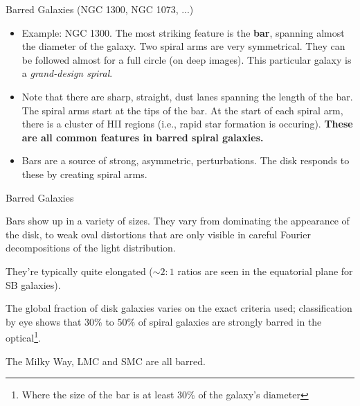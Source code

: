 \documentclass[letterpaper,landscape]{slides}
\begin{document}
\begin{slide}
\begin{center}
{\large \color{red} 
                  Barred Galaxies (NGC 1300, NGC 1073, ...)  }
\end{center}

\begin{itemize}
\item Example: NGC 1300. The most striking feature is the {\bf bar},
spanning almost the diameter of the galaxy. Two spiral arms are very
symmetrical. They can be followed almost for a full circle (on deep images).
This particular galaxy is a {\em grand-design spiral}.

\item Note that there are sharp, straight, dust lanes spanning the length of
the bar. The spiral arms start at the tips of the bar. At the start of each
spiral arm, there is a cluster of HII regions (i.e., rapid star formation is
occuring). {\bf These are all common features in barred spiral galaxies.}

\item Bars are a source of strong, asymmetric, perturbations. The disk responds
to these by creating spiral arms.

\end{itemize}

\vfill
\end{slide}


\begin{slide}
\begin{center}
{\large \color{red} 
                  Barred Galaxies  }
\end{center}

Bars show up in a variety of sizes. They vary from dominating the appearance
of the disk, to weak oval distortions that are only visible in careful
Fourier decompositions of the light distribution.

They're typically quite elongated ($\sim 2:1$ ratios are seen in the
equatorial plane for SB galaxies).

The global fraction of disk galaxies varies on the exact criteria used;
classification by eye shows that 30\% to 50\% of spiral galaxies are
strongly barred in the optical\footnote{Where the size of the bar is
at least 30\% of the galaxy's diameter}.

The Milky Way, LMC and SMC are all barred.

\vfill
\end{slide}
\end{document}
